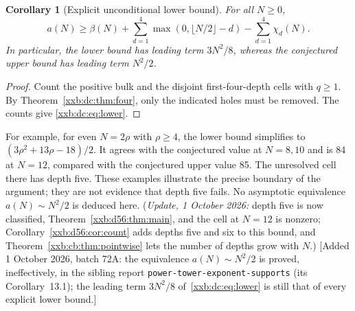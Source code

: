 \documentclass[11pt,a4paper]{article}
\numberwithin{equation}{section}
\newtheorem{corollary}[theorem]{Corollary}
\theoremstyle{definition}
\theoremstyle{remark}
\theoremstyle{plain}
\newcommand{\sibPTE}{\texttt{power-\allowbreak{}tower-\allowbreak{}exponent-\allowbreak{}supports}}
\begin{document}
\begin{corollary}[Explicit unconditional lower bound]\label{xxb:dc:cor:lower}
For all $N\ge0$,
\begin{equation}\label{xxb:dc:eq:lower}
 a(N)\ge \beta(N)+\sum_{d=1}^4\max(0,\lfloor N/2\rfloor-d)
                  -\sum_{d=1}^4\chi_d(N).
\end{equation}
In particular, the lower bound has leading term $3N^2/8$, whereas the
conjectured upper bound has leading term $N^2/2$.
\end{corollary}
\begin{proof}
Count the positive bulk and the disjoint first-four-depth cells with
$q\ge1$.  By Theorem~\ref{xxb:dc:thm:four}, only the indicated holes must be
removed.  The counts give \eqref{xxb:dc:eq:lower}.
\end{proof}

For example, for even $N=2\rho$ with $\rho\ge4$, the lower bound simplifies to
$(3\rho^2+13\rho-18)/2$.  It agrees with the conjectured value at $N=8,10$ and is
84 at $N=12$, compared with the conjectured upper value 85.  The unresolved
cell there has depth five.  These examples illustrate the precise
boundary of the argument; they are not evidence that depth five fails.
No asymptotic equivalence $a(N)\sim N^2/2$ is deduced here.
(\emph{Update, 1 October 2026:} depth five is now classified,
Theorem~\ref{xxb:d56:thm:main}, and the cell at $N=12$ is nonzero;
Corollary~\ref{xxb:d56:cor:count} adds depths five and six to this bound,
and Theorem~\ref{xxb:cb:thm:pointwise} lets the number of depths grow with $N$.)
[Added 1 October 2026, batch 72A: the equivalence $a(N)\sim N^2/2$ is proved, ineffectively,
in the sibling report \sibPTE{} (its Corollary~13.1); the leading
term $3N^2/8$ of~\eqref{xxb:dc:eq:lower} is still that of every explicit lower
bound.]
\end{document}

